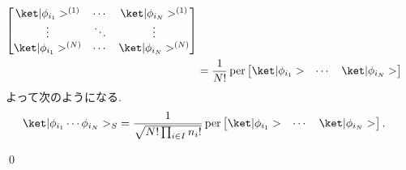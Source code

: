 \documentclass[uplatex,dvipdfmx,a4paper,11pt]{jlreq}
\makeatletter
\DeclareMathOperator{\per}{per}
\numberwithin{equation}{section}
\theoremstyle{definition}
\renewenvironment{proof}[1][\proofname]{\par
  \normalfont
  \topsep6\p@\@plus6\p@ \trivlist
  \item[\hskip\labelsep{\bfseries #1}\@addpunct{\bfseries}]\ignorespaces\quad\par
}{
  \qed\endtrivlist\@endpefalse
}
\renewcommand\proofname{証明}
\makeatother
\begin{document}
\begin{proof}
\begin{align}
\begin{bmatrix}
                                                                               \ket|\phi_{i_1}>^{(1)} & \cdots & \ket|\phi_{i_N}>^{(1)} \\
                                                                               \vdots                 & \ddots & \vdots                 \\
                                                                               \ket|\phi_{i_1}>^{(N)} & \cdots & \ket|\phi_{i_N}>^{(N)}
                                                                             \end{bmatrix}                                           \\
                                                         & = \frac{1}{N!}\per\begin{bmatrix}\ket|\phi_{i_1}> & \cdots & \ket|\phi_{i_N}>\end{bmatrix}
  \end{align}
  よって次のようになる.
  \begin{align}
    \ket|\phi_{i_1}\cdots\phi_{i_N}>_S & = \frac{1}{\sqrt{N!\prod_{i\in I}n_i!}}\per\begin{bmatrix}\ket|\phi_{i_1}> & \cdots & \ket|\phi_{i_N}>\end{bmatrix}.
  \end{align}
\end{proof}
\end{document}
